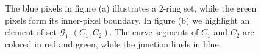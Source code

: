 \documentclass[smallextended]{svjour3}       %
\begin{document}
\begin{figure}[!h]
\center
	\hspace{40pt}%
	\caption{The blue pixels in figure (a) illustrates a $2$-ring set, while the green pixels form its inner-pixel boundary. In figure (b) we highlight an element of set $\mathcal{G}_{11}(C_1,C_2)$. The curve segments of $C_1$ and $C_2$ are colored in red and green, while the junction linels in blue.}
\end{figure}
\end{document}
